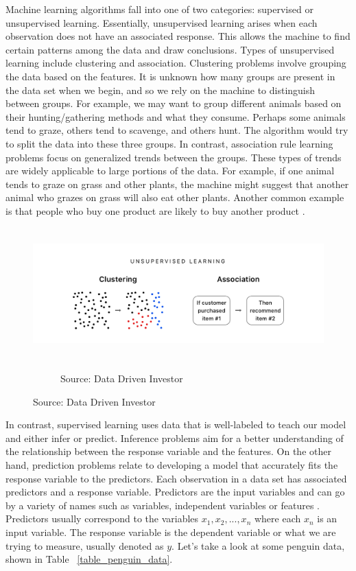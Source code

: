 \documentclass[12pt]{article}
\begin{document}
Machine learning algorithms fall into one of two categories: supervised or unsupervised learning. Essentially, unsupervised learning arises when each observation does not have an associated response. This allows the machine to find certain patterns among the data and draw conclusions. Types of unsupervised learning include clustering and association. Clustering problems involve grouping the data based on the features. It is unknown how many groups are present in the data set when we begin, and so we rely on the machine to distinguish between groups. For example, we may want to group different animals based on their hunting/gathering methods and what they consume. Perhaps some animals tend to graze, others tend to scavenge, and others hunt. The algorithm would try to split the data into these three groups. In contrast, association rule learning problems focus on generalized trends between the groups. These types of trends are widely applicable to large portions of the data. For example, if one animal tends to graze on grass and other plants, the machine might suggest that another animal who grazes on grass will also eat other plants. Another common example is that people who buy one product are likely to buy another product \cite{supvunsup}.

\begin{figure}[ht]
    \centering
    \includegraphics[height=2in]{Figures/clustering_v_association.png}
    \captionsetup[subfigure]{labelformat=empty}
    \begin{subfigure}[]{0.5\textwidth}
         \centering
         \caption{Source: Data Driven Investor}
     \end{subfigure}
    \label{fig1}
\end{figure}

In contrast, supervised learning uses data that is well-labeled to teach our model and either infer or predict. Inference problems aim for a better understanding of the relationship between the response variable and the features. On the other hand, prediction problems relate to developing a model that accurately fits the response variable to the predictors. Each observation in a data set has associated predictors and a response variable. Predictors are the input variables and can go by a variety of names such as variables, independent variables or features \cite{introstatlearning}. Predictors usually correspond to the variables $x_1,x_2,...,x_n$ where each $x_n$ is an input variable. The response variable is the dependent variable or what we are trying to measure, usually denoted as $y$. Let's take a look at some penguin data, shown in Table ~\ref{table_penguin_data}.
\end{document}
